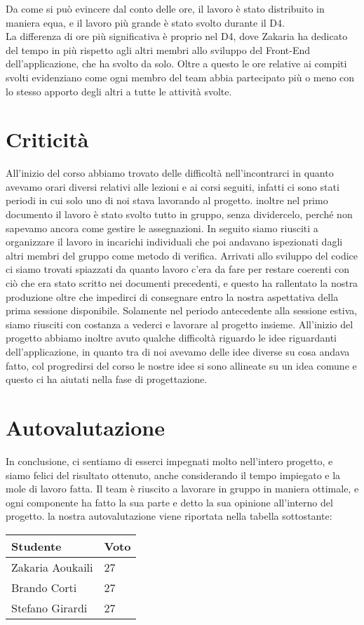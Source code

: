 \documentclass{article}
\begin{document}
Da come si può evincere dal conto delle ore, il lavoro è stato distribuito in maniera equa, e il lavoro più grande è stato svolto durante il D4.\\
La differenza di ore più significativa è proprio nel D4, dove Zakaria ha dedicato del tempo in più rispetto agli altri membri allo sviluppo del Front-End dell'applicazione, che ha svolto da solo. Oltre a questo le ore relative ai compiti svolti evidenziano come ogni membro del team abbia partecipato più o meno con lo stesso apporto degli altri a tutte le attività svolte.

\section{Criticità}
All'inizio del corso abbiamo trovato delle difficoltà nell'incontrarci in quanto avevamo orari diversi relativi alle lezioni e ai corsi seguiti, infatti ci sono stati periodi in cui solo uno di noi stava lavorando al progetto.
inoltre nel primo documento il lavoro è stato svolto tutto in gruppo, senza dividercelo, perché non sapevamo ancora come gestire le assegnazioni. In seguito siamo riusciti a organizzare il lavoro in incarichi individuali che poi andavano ispezionati dagli altri membri del gruppo come metodo di verifica.
Arrivati allo sviluppo del codice ci siamo trovati spiazzati da quanto lavoro c'era da fare per restare coerenti con  ciò che era stato scritto nei documenti precedenti, e questo ha rallentato la nostra produzione oltre che impedirci di consegnare entro la nostra aspettativa della prima sessione disponibile. Solamente nel periodo antecedente alla sessione estiva, siamo riusciti con costanza a vederci e lavorare al progetto insieme. 
All'inizio del progetto abbiamo inoltre avuto qualche difficoltà riguardo le idee riguardanti dell'applicazione, in quanto tra di noi avevamo delle idee diverse su cosa andava fatto, col progredirsi del corso le nostre idee si sono allineate su un idea comune e questo ci ha aiutati nella fase di progettazione.

 \newpage
\section{Autovalutazione}
In conclusione, ci sentiamo di esserci impegnati molto nell'intero progetto, e siamo felici del risultato ottenuto, anche considerando il tempo impiegato e la mole di lavoro fatta. Il team è riuscito a lavorare in gruppo in maniera ottimale, e ogni componente ha fatto la sua parte e detto la sua opinione  all'interno del progetto. 
la nostra autovalutazione viene riportata nella tabella sottostante:
\begin{table}[H]
\centering
\begin{tabular}{|l|l|}
\hline
\textbf{Studente} & \textbf{Voto} \\
\hline
Zakaria Aoukaili & 27 \\
Brando Corti & 27 \\
Stefano Girardi & 27 \\
\hline
\end{tabular}
\end{table}
\end{document}

